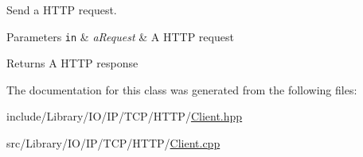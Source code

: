 Send a H\+T\+TP request. 


\begin{DoxyParams}[1]{Parameters}
\mbox{\tt in}  & {\em a\+Request} & A H\+T\+TP request \\
\hline
\end{DoxyParams}
\begin{DoxyReturn}{Returns}
A H\+T\+TP response 
\end{DoxyReturn}


The documentation for this class was generated from the following files\+:\begin{DoxyCompactItemize}
\item 
include/\+Library/\+I\+O/\+I\+P/\+T\+C\+P/\+H\+T\+T\+P/\hyperlink{_h_t_t_p_2_client_8hpp}{Client.\+hpp}\item 
src/\+Library/\+I\+O/\+I\+P/\+T\+C\+P/\+H\+T\+T\+P/\hyperlink{_client_8cpp}{Client.\+cpp}\end{DoxyCompactItemize}
